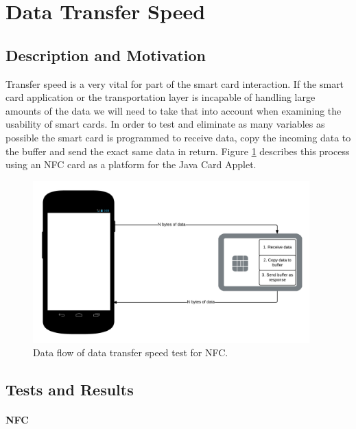 \section{Data Transfer Speed}
\subsection{Description and Motivation}
Transfer speed is a very vital for part of the smart card interaction. If the smart card application or the transportation layer is incapable of handling large amounts of the data we will need to take that into account when examining the usability of smart cards. In order to test and eliminate as many variables as possible the smart card is programmed to receive data, copy the incoming data to the buffer and send the exact same data in return. Figure \ref{fig:nfcDataflowTest} describes this process using an NFC card as a platform for the Java Card Applet.

\begin{figure}[h!]
  \caption{Data flow of data transfer speed test for NFC.}
  \label{fig:nfcDataflowTest}
  \centering
    \includegraphics[width=0.95\textwidth]{images/NFCTransferTest.png}
\end{figure}

\subsection{Tests and Results}
\paragraph{NFC}\mbox{}\\



